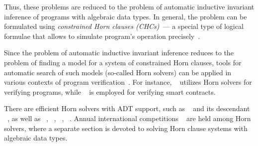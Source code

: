 Thus, these problems are reduced to the problem of automatic inductive invariant inference of programs with algebraic data types. In general, the problem can be formulated using \emph{constrained Horn clauses (CHCs)}~--- a special type of logical formulae that allows to simulate program's operation precisely~\cite{MAKOWSKY1987266}.

Since the problem of automatic inductive invariant inference reduces to the problem of finding a model for a system of constrained Horn clauses, tools for automatic search of such models (so-called Horn solvers) can be applied in various contexts of program verification~\cite{10.1145/2254064.2254112, Bjorner2015}.
For instance, \rustHorn{}~\cite{10.1145/3462205} utilizes Horn solvers for verifying \rust{} programs, while \solCMC{}~\cite{10.1007/978-3-031-13185-1_16} is employed for verifying \solidity{} smart contracts.

There are efficient Horn solvers with ADT support, such as \spacer{}~\cite{komuravelli2016smt} and its descendant \racer{}~\cite{10.1145/3498722}, as well as \eldarica{}~\cite{8603013}, \hoice{}~\cite{10.1007/978-3-030-02768-1_8}, \rchc{}~\cite{haude2020}, \vericat{}~\cite{de_angelis_proietti_fioravanti_pettorossi_2022}.
Annual international competitions \chccomp{}~\cite{De_Angelis_2022} are held among Horn solvers, where a separate section is devoted to solving Horn clause systems with algebraic data types.

